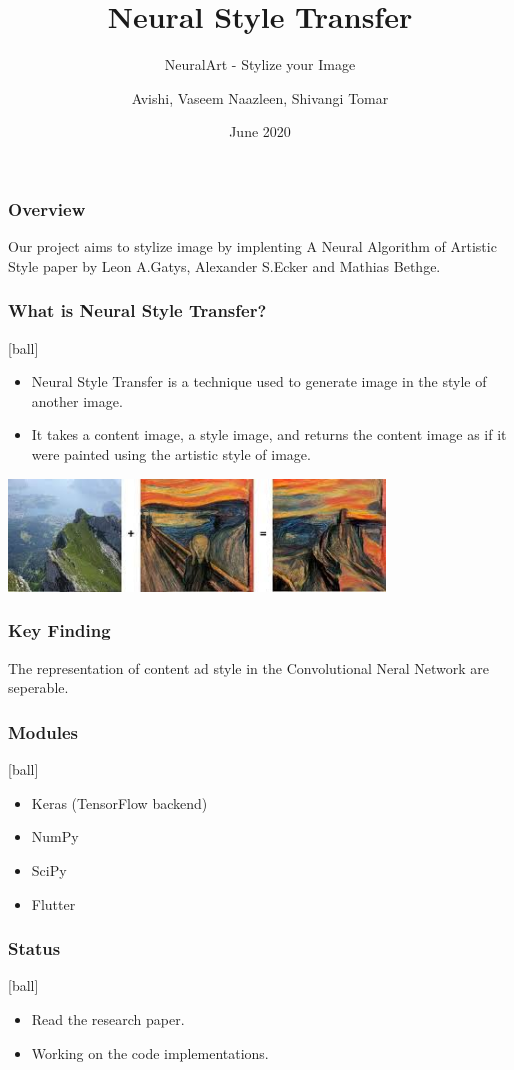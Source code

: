 \documentclass[14pt]{beamer}
\title[NST]{Neural Style Transfer}
\subtitle{NeuralArt - Stylize your Image}
\author[Team - 38]{Avishi, Vaseem Naazleen, Shivangi Tomar}
\date{June 2020}
\begin{document}
\begin{frame}
   \titlepage
\end{frame}

\begin{frame}
		\frametitle{Overview}
		Our project aims to stylize image by implenting A Neural Algorithm of Artistic Style paper by Leon A.Gatys, Alexander S.Ecker and Mathias Bethge.
\end{frame}

\begin{frame}
		\frametitle{What is Neural Style Transfer?}
		\begin{itemize}
		\item Neural Style Transfer is a technique used to generate image in the style of another image.
		\item It takes a content image, a style image, and returns the content image as if it were painted using the artistic style of image.
		\end{itemize}
		\includegraphics[width=100mm]{image.jpg}
\end{frame}

\begin{frame}
		\frametitle{Key Finding}
		The representation of content ad style in the Convolutional Neral Network are seperable.
\end{frame}

\begin{frame}
		\frametitle{Modules}
		\begin{itemize}
		\item Keras (TensorFlow backend)
		\item NumPy
		\item SciPy
		\item Flutter
		\end{itemize}
\end{frame}

\begin{frame}
		\frametitle{Status}
		\begin{itemize}
		\item Read the research paper.
		\item Working on the code implementations.
		\end{itemize}
\end{frame}
\end{document}
